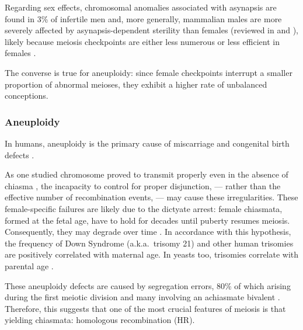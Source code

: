Regarding sex effects, chromosomal anomalies associated with asynapsis are found in 3\% of infertile men \citep[cited in \citealp{burgoyne2009consequences}]{vincent2002cytogenetic} and, more generally, mammalian males are more severely affected by asynapsis-dependent sterility than females (reviewed in \citealp{burgoyne2009consequences} and \citealp{hunt2002sex}), likely because meiosis checkpoints are either less numerous or less efficient in females \citep{champion2002playing}.

The converse is true for aneuploidy: since female checkpoints interrupt a smaller proportion of abnormal meioses, they exhibit a higher rate of unbalanced conceptions.



\subsubsection{Aneuploidy}
In humans, aneuploidy is the primary cause of miscarriage and congenital birth defects \citep{hassold2007origin}.

As one studied chromosome proved to transmit properly even in the absence of chiasma \citep{fledel-alon2009broadscale}, the incapacity to control for proper disjunction, — rather than the effective number of recombination events, — may cause these irregularities.
These female-specific failures are likely due to the dictyate arrest: female chiasmata, formed at the fetal age, have to hold for decades until puberty resumes meiosis.
Consequently, they may degrade over time \citep{hassold2001err}.
In accordance with this hypothesis, the frequency of Down Syndrome (a.k.a.\ trisomy 21) \citep{penrose2009relative} and other human trisomies \citep[reviewed in \citealp{hassold1996human} and \citealp{smith1998recombination}]{morton1988maternal} are positively correlated with maternal age. 
In yeasts too, trisomies correlate with parental age \citep{boselli2009effects}.

These aneuploidy defects are caused by segregation errors, 80\% of which arising during the first meiotic division and many involving an achiasmate bivalent \citep{szekvolgyi2010meiosisa}.
Therefore, this suggests that one of the most crucial features of meiosis is that yielding chiasmata: homologous recombination (HR).










